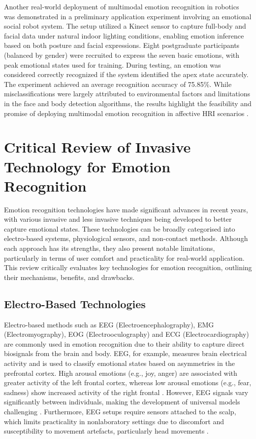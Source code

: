 Another real-world deployment of multimodal emotion recognition in robotics was demonstrated in a preliminary application experiment involving an emotional social robot system. The setup utilized a Kinect sensor to capture full-body and facial data under natural indoor lighting conditions, enabling emotion inference based on both posture and facial expressions. Eight postgraduate participants (balanced by gender) were recruited to express the seven basic emotions, with peak emotional states used for training. During testing, an emotion was considered correctly recognized if the system identified the apex state accurately. The experiment achieved an average recognition accuracy of 75.85\%. While misclassifications were largely attributed to environmental factors and limitations in the face and body detection algorithms, the results highlight the feasibility and promise of deploying multimodal emotion recognition in affective HRI scenarios \cite{Chen2023-ss}.

\section{Critical Review of Invasive Technology for Emotion Recognition}
Emotion recognition technologies have made significant advances in recent years, with various invasive and less invasive techniques being developed to better capture emotional states. These technologies can be broadly categorised into electro-based systems, physiological sensors, and non-contact methods. Although each approach has its strengths, they also present notable limitations, particularly in terms of user comfort and practicality for real-world application. This review critically evaluates key technologies for emotion recognition, outlining their mechanisms, benefits, and drawbacks.

\subsection{Electro-Based Technologies}
Electro-based methods such as EEG (Electroencephalography), EMG (Electromyography), EOG (Electrooculography) and ECG (Electrocardiography) are commonly used in emotion recognition due to their ability to capture direct biosignals from the brain and body. EEG, for example, measures brain electrical activity and is used to classify emotional states based on asymmetries in the prefrontal cortex. High arousal emotions (e.g., joy, anger) are associated with greater activity of the left frontal cortex, whereas low arousal emotions (e.g., fear, sadness) show increased activity of the right frontal \cite{Suhaila2021-dh}. However, EEG signals vary significantly between individuals, making the development of universal models challenging \cite{Pal2021-eq}. Furthermore, EEG setups require sensors attached to the scalp, which limits practicality in nonlaboratory settings due to discomfort and susceptibility to movement artefacts, particularly head movements \cite{Tan2021-ai}.

